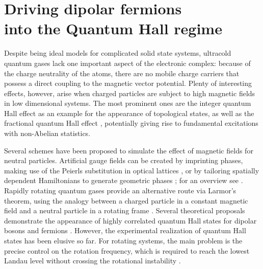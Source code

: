 
\chapter[Driving dipolar fermions into the Quantum Hall regime]{Driving dipolar fermions\texorpdfstring{\\}{ }into the Quantum Hall regime}
\label{dipolar_fermions}




Despite being ideal models for complicated solid state systems, ultracold quantum gases lack one important aspect of the electronic complex: because of the charge neutrality of the atoms, there are no mobile charge carriers that possess a direct coupling to the magnetic vector potential. Plenty of interesting effects, however, arise when charged particles are subject to high magnetic fields in low dimensional systems. The most prominent ones are the integer quantum Hall effect \cite{Klitzing1980} as an example for the appearance of topological states, as well as the fractional quantum Hall effect \cite{Laughlin1983}, potentially giving rise to fundamental excitations with non-Abelian statistics.

Several schemes have been proposed to simulate the effect of magnetic fields for neutral particles. Artificial gauge fields can be created by imprinting phases, making use of the Peierls substitution in optical lattices \cite{Aidelsburger2011,Jimenez-Garcia2012,Struck2012}, or by tailoring spatially dependent Hamiltonians to generate geometric phases \cite{Lin2009}; for an overview see \cite{Dalibard2011}. Rapidly rotating quantum gases provide an alternative route via Larmor's theorem, using the analogy between a charged particle in a constant magnetic field and a neutral particle in a rotating frame
\cite{Cooper2008,Fetter2009}. Several theoretical proposals demonstrate the appearance of highly correlated quantum Hall states for dipolar bosons \cite{Cooper2005} and fermions \cite{Baranov2005,Osterloh2007}. However, the experimental realization of quantum Hall states has been elusive so far. For rotating systems, the main problem is the precise control on the rotation frequency, which is required to reach the lowest Landau level without crossing the rotational instability \cite{Schweikhard2004}.

